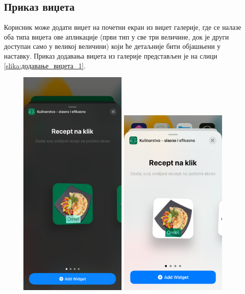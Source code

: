 \documentclass[12pt,oneside]{memoir}
\begin{document}
\subsection{Приказ виџета} 

\indent Корисник може додати виџет на почетни екран из виџет галерије, где се налазе оба типа виџета ове апликације (први тип у све три величине, док је други доступан само у великој величини) који ће детаљније бити објашњени у наставку. Приказ додавања виџета из галерије представљен је на слици \ref{slika:додавање_виџета_1}.

\begin{figure} [H]
    \centering
    \captionsetup{justification=centering}
    \includegraphics[width=0.475\textwidth]{images/simulators/view images/dark - add widget.png} 
    \hfill
    \includegraphics[width=0.475\textwidth]{images/simulators/view images/light - add widget.png} 

\end{figure}
\end{document}
